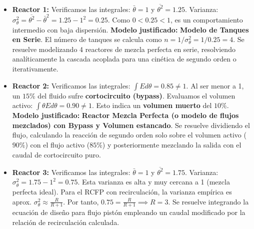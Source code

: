 \begin{itemize}
	\item \textbf{Reactor 1:}
	      Verificamos las integrales: $\bar{\theta} = 1$ y $\overline{\theta^2} = 1.25$.
	      Varianza: $\sigma_\theta^2 = \overline{\theta^2} - \bar{\theta}^2 = 1.25 - 1^2 = 0.25$.
	      Como $0 < 0.25 < 1$, es un comportamiento intermedio con baja dispersión.
	      \textbf{Modelo justificado:} \textbf{Modelo de Tanques en Serie}. El número de tanques se calcula como $n = 1/\sigma_\theta^2 = 1/0.25 = 4$.
	      Se resuelve modelizando 4 reactores de mezcla perfecta en serie, resolviendo analíticamente la cascada acoplada para una cinética de segundo orden o iterativamente.

	\item \textbf{Reactor 2:}
	      Verificamos las integrales: $\int E d\theta = 0.85 \neq 1$. Al ser menor a 1, un $15\%$ del fluido sufre \textbf{cortocircuito (bypass)}.
	      Evaluamos el volumen activo: $\int \theta E d\theta = 0.90 \neq 1$. Esto indica un \textbf{volumen muerto} del $10\%$.
	      \textbf{Modelo justificado:} \textbf{Reactor Mezcla Perfecta (o modelo de flujos mezclados) con Bypass y Volumen estancado}.
	      Se resuelve dividiendo el flujo, calculando la reacción de segundo orden solo sobre el volumen activo ($90\%$) con el flujo activo ($85\%$) y posteriormente mezclando la salida con el caudal de cortocircuito puro.

	\item \textbf{Reactor 3:}
	      Verificamos las integrales: $\bar{\theta} = 1$ y $\overline{\theta^2} = 1.75$.
	      Varianza: $\sigma_\theta^2 = 1.75 - 1^2 = 0.75$.
	      Esta varianza es alta y muy cercana a 1 (mezcla perfecta ideal).
	      Para el RCFP con recirculación, la varianza empírica es aprox. $\sigma_\theta^2 \approx \frac{R}{R+1}$. Por tanto, $0.75 = \frac{R}{R+1} \implies R = 3$. Se resuelve integrando la ecuación de diseño para flujo pistón empleando un caudal modificado por la relación de recirculación calculada.
\end{itemize}

